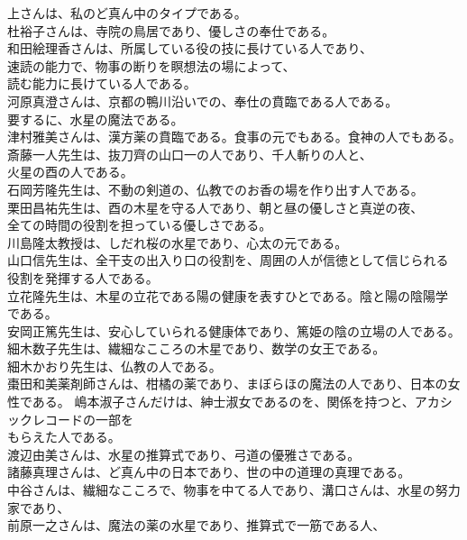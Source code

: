 \documentclass{jsarticle}
\begin{document}
上さんは、私のど真ん中のタイプである。 \\
杜裕子さんは、寺院の鳥居であり、優しさの奉仕である。 \\
和田絵理香さんは、所属している役の技に長けている人であり、\\
速読の能力で、物事の断りを瞑想法の場によって、\\
読む能力に長けている人である。\\
河原真澄さんは、京都の鴨川沿いでの、奉仕の賁臨である人である。\\
要するに、水星の魔法である。\\
津村雅美さんは、漢方薬の賁臨である。食事の元でもある。食神の人でもある。\\
斎藤一人先生は、抜刀齊の山口一の人であり、千人斬りの人と、\\
火星の酉の人である。\\
石岡芳隆先生は、不動の剣道の、仏教でのお香の場を作り出す人である。\\
栗田昌祐先生は、酉の木星を守る人であり、朝と昼の優しさと真逆の夜、\\
全ての時間の役割を担っている優しさである。\\
川島隆太教授は、しだれ桜の水星であり、心太の元である。\\
山口信先生は、全干支の出入り口の役割を、周囲の人が信徳として信じられる \\
役割を発揮する人である。\\
立花隆先生は、木星の立花である陽の健康を表すひとである。陰と陽の陰陽学 \\
である。\\
安岡正篤先生は、安心していられる健康体であり、篤姫の陰の立場の人である。\\
細木数子先生は、繊細なこころの木星であり、数学の女王である。\\
細木かおり先生は、仏教の人である。\\
棗田和美薬剤師さんは、柑橘の薬であり、まぼらほの魔法の人であり、日本の女性である。
嶋本淑子さんだけは、紳士淑女であるのを、関係を持つと、アカシックレコードの一部を \\
もらえた人である。\\
渡辺由美さんは、水星の推算式であり、弓道の優雅さである。\\
諸藤真理さんは、ど真ん中の日本であり、世の中の道理の真理である。\\
中谷さんは、繊細なこころで、物事を中てる人であり、溝口さんは、水星の努力家であり、\\
前原一之さんは、魔法の薬の水星であり、推算式で一筋である人、\\
\end{document}
